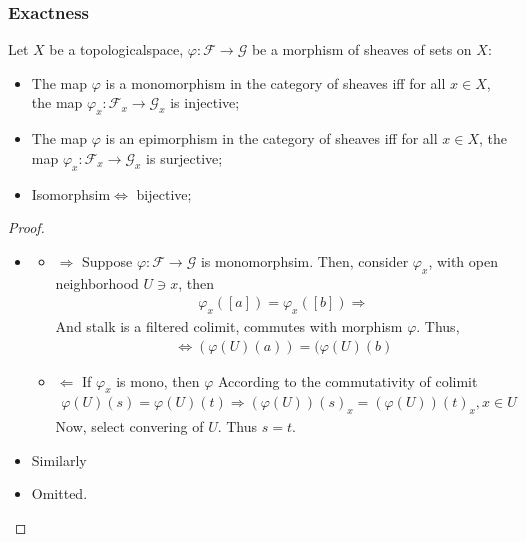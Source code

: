 \documentclass[Total.tex]{subfiles}
\begin{document}
				\subsubsection{Exactness}
				\begin{lemma}
					\label{Sheaves-Sheaves-Exactness-at-Point}Let $X$ be a topologicalspace, $\varphi:\mathcal{F}\rightarrow \mathcal{G}$ be a morphism of sheaves of sets on $X$:
					
					\begin{itemize}
						\item The map $\varphi$ is a monomorphism in the category of sheaves iff for all $x\in X$, the map $\varphi_x:\mathcal{F}_x\rightarrow \mathcal{G}_x$ is injective;
						\item The map $\varphi$ is an epimorphism in the category of sheaves iff for all $x\in X$, the map $\varphi_x:\mathcal{F}_x\rightarrow \mathcal{G}_x$ is surjective;
						\item Isomorphsim$\Leftrightarrow$ bijective;
					\end{itemize}
				\end{lemma}
				
				\begin{proof}
					\begin{itemize}
						\item \begin{itemize}
							\item $\Rightarrow$  Suppose $\varphi:\mathcal{F}\rightarrow \mathcal{G}$ is monomorphsim. Then, consider $\varphi_x$, with open neighborhood $U\ni x$, then
							\begin{gather*}
								\varphi_x([a])=\varphi_x([b])\Rightarrow 
							\end{gather*}
							And stalk is a filtered colimit, commutes with morphism $\varphi$. Thus,
							\begin{gather*}
								\Leftrightarrow (\varphi(U)(a))=(\varphi(U)(b)
							\end{gather*}
							\item $\Leftarrow$ If $\varphi_x$ is mono, then $\varphi$ According to the commutativity of colimit
							\begin{gather*}
								\varphi(U)(s)=\varphi(U)(t)\Rightarrow (\varphi(U))(s)_x=(\varphi(U))(t)_x,x\in U
							\end{gather*}
							Now, select convering of $U$. Thus $s=t$.
						\end{itemize}
						\item Similarly
						\item Omitted.
					\end{itemize}
				\end{proof}
				
\end{document}
